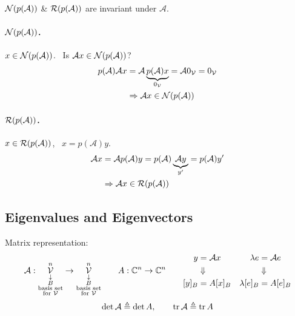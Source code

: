 \begin{example}
$\mathcal{N}(p(\mathcal{A}))$ \& $\mathcal{R}(p(\mathcal{A}))$ are invariant under $\mathcal{A}$.

\paragraph{$\mathcal{N}(p(\mathcal{A}))$.} $x\in\mathcal{N}(p(\mathcal{A}))$. \ Is $\mathcal{A}x\in\mathcal{N}(p(\mathcal{A}))$?
\begin{align*}
p(\mathcal{A})\mathcal{A}x&=\mathcal{A}\underbrace{p(\mathcal{A})x}_{0_{\mathcal{V}}}=\mathcal{A}0_{\mathcal{V}}=0_{\mathcal{V}}\\
&\Rightarrow\mathcal{A}x\in\mathcal{N}(p(\mathcal{A}))
\end{align*}

%
\paragraph{$\mathcal{R}(p(\mathcal{A}))$.} $x\in\mathcal{R}(p(\mathcal{A}))$, \ $x=p(\mathcal{A})y$.
\begin{align*}
\mathcal{A}x&=\mathcal{A}p(\mathcal{A})y=p(\mathcal{A})\underbrace{\mathcal{A}y}_{y'}=p(\mathcal{A})y'\\
&\Rightarrow\mathcal{A}x\in\mathcal{R}(p(\mathcal{A}))
\end{align*}
\end{example}

\subsection{Eigenvalues and Eigenvectors}\label{ss:eigen}
\point Matrix representation:
\[
\mathcal{A}:\underset{\substack{\downarrow\\ B\\ \text{basis set}\\ \text{for }\mathcal{V}}}{\overset{n}{\mathcal{V}}}\to\underset{\substack{\downarrow\\ B\\ \text{basis set}\\ \text{for }\mathcal{V}}}{\overset{n}{\mathcal{V}}}
\qquad A:\mathbb{C}^n\to\mathbb{C}^n
\qquad
\begin{aligned}
y&=\mathcal{A}x &\quad \lambda e&=\mathcal{A}e\\
&\Downarrow & &\Downarrow\\
[y]_B&=A[x]_B & \lambda[e]_B&=A[e]_B
\end{aligned}
\]
\[
\det\mathcal{A}\triangleq\det A,\qquad \operatorname{tr}\mathcal{A}\triangleq\operatorname{tr} A
\]


